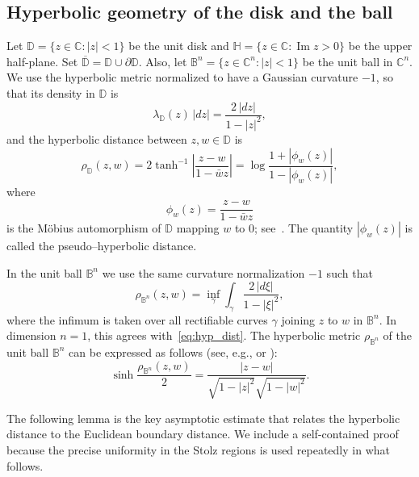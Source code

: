 \documentclass[12pt]{amsart}
\numberwithin{equation}{section}
\theoremstyle{plain}
\theoremstyle{definition}
\begin{document}
\subsection{Hyperbolic geometry of the disk and the ball}
\label{subsec:hyp_geom}

Let $\mathbb{D}=\{z\in\mathbb{C}:|z|<1\}$ be the unit disk and
$\mathbb{H}=\{z\in\mathbb{C}:\operatorname{Im}z>0\}$ be the
upper half-plane. Set $\overline{\mathbb{D}}=\mathbb{D}\cup \partial \mathbb{D}$. Also, let
$\mathbb{B}^n=\{z\in\mathbb{C}^n:|z|<1\}$ be
the unit ball in $\mathbb{C}^n$.
We use the hyperbolic metric normalized to have a Gaussian
curvature $-1$, so that its density in $\mathbb{D}$ is
\begin{equation*}
\label{lambda_density}
\lambda_{\mathbb{D}}(z)\,|dz|
=\frac{2\,|dz|}{1-|z|^2},
\end{equation*}
and the hyperbolic distance between $z,w\in\mathbb{D}$ is
\begin{equation}
\label{eq:hyp_dist}
\rho_{\mathbb{D}}(z,w)
=2\tanh^{-1} \left|\frac{z-w}{1-\bar w z}\right|
=\log\frac{1+|\phi_w(z)|}{1-|\phi_w(z)|},
\end{equation}
where
\begin{equation}
\label{phi}
\phi_w(z)=\frac{z-w}{1-\bar w z}
\end{equation}
is the M\"obius automorphism of $\mathbb{D}$ mapping $w$
to $0$; see~\cite[Theorem~2.2]{BM}. The quantity $|\phi_w(z)|$ is called the pseudo--hyperbolic distance.


In the unit ball $\mathbb{B}^n$ we use the same curvature
normalization $-1$ such that
\begin{equation*}
\rho_{\mathbb{B}^n}(z,w)
=\inf_\gamma\int_\gamma\frac{2\,|d\xi|}{1-|\xi|^2},
\end{equation*}
where the infimum is taken over all rectifiable curves $\gamma$
joining $z$ to $w$ in $\mathbb{B}^n$.
In dimension $n=1$, this agrees with~\eqref{eq:hyp_dist}.
The hyperbolic metric $\rho_{\mathbb{B}^n}$ of the unit ball $\mathbb{B}^n$ can be expressed as follows (see, e.g., \cite[p. 40]{B83} or \cite[p. 55]{HKV}):
\begin{equation}
\label{hyperb-unit ball}
\sinh \frac{\rho_{\mathbb{B}^n}(z,w)}{2}
=\frac{|z-w|}{\sqrt{1-|z|^2}\sqrt{1-|w|^2}}.
\end{equation}



The following lemma is the key asymptotic estimate that
relates the hyperbolic distance to the Euclidean boundary distance.
We include a self-contained proof because the precise
uniformity in the Stolz regions is used repeatedly in what
follows.
\end{document}
